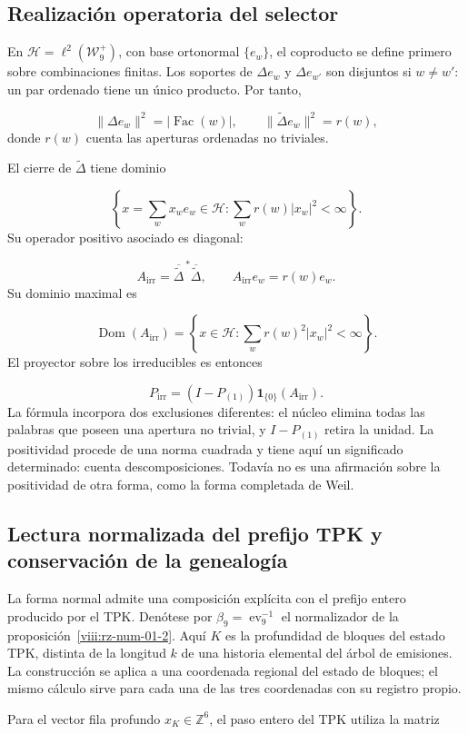 \subsection{Realización operatoria del selector}
En \(\mathcal H=\ell^2(\mathcal W_9^+)\), con base ortonormal \(\{e_w\}\), el coproducto se define primero sobre combinaciones finitas. Los soportes de $\Delta e_w$ y $\Delta e_{w'}$ son disjuntos si $w\ne w'$: un par ordenado tiene un único producto. Por tanto,

\[
\|\Delta e_w\|^2=|\operatorname{Fac}(w)|,
\qquad
\|\widetilde\Delta e_w\|^2=r(w),
\]
donde $r(w)$ cuenta las aperturas ordenadas no triviales.

El cierre de $\widetilde\Delta$ tiene dominio

\[
\left\{x=\sum_wx_we_w\in\mathcal H:\sum_wr(w)|x_w|^2<\infty\right\}.
\]
Su operador positivo asociado es diagonal:

\[
A_{\mathrm{irr}}=\overline{\widetilde\Delta}^{\,*}\overline{\widetilde\Delta},
\qquad A_{\mathrm{irr}}e_w=r(w)e_w.
\]
Su dominio maximal es

\[
\operatorname{Dom}(A_{\mathrm{irr}})
=\left\{x\in\mathcal H:\sum_wr(w)^2|x_w|^2<\infty\right\}.
\]
El proyector sobre los irreducibles es entonces

\[
P_{\mathrm{irr}}=(I-P_{(1)})\mathbf1_{\{0\}}(A_{\mathrm{irr}}).
\]
La fórmula incorpora dos exclusiones diferentes: el núcleo elimina todas las palabras que poseen una apertura no trivial, y $I-P_{(1)}$ retira la unidad. La positividad procede de una norma cuadrada y tiene aquí un significado determinado: cuenta descomposiciones. Todavía no es una afirmación sobre la positividad de otra forma, como la forma completada de Weil.

\subsection{Lectura normalizada del prefijo TPK y conservación de la genealogía}
La forma normal admite una composición explícita con el prefijo entero producido por el TPK. Denótese por \(\beta_9=\operatorname{ev}_9^{-1}\) el normalizador de la proposición~\ref{viii:rz-num-01-2}. Aquí \(K\) es la profundidad de bloques del estado TPK, distinta de la longitud \(k\) de una historia elemental del árbol de emisiones. La construcción se aplica a una coordenada regional del estado de bloques; el mismo cálculo sirve para cada una de las tres coordenadas con su registro propio.

Para el vector fila profundo \(x_K\in\mathbb Z^6\), el paso entero del TPK utiliza la matriz

